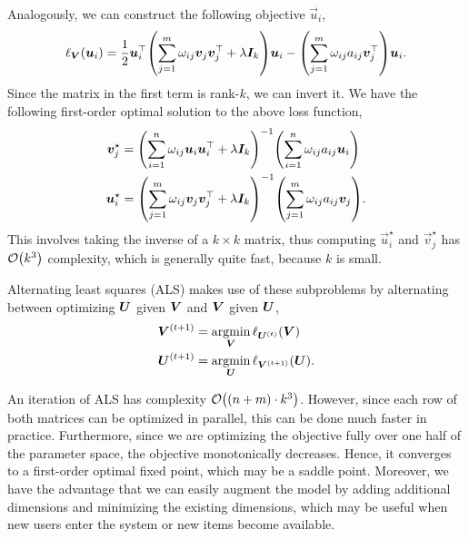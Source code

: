 Analogously, we can construct the following objective \wrt $\vec{u}_i$, \[
    \ell_{\mat{V}}(\vec{u}_i) = \frac{1}{2} \transpose{\vec{u}_i} \lft( \sum_{j=1}^{m} \omega_{ij} \vec{v}_j \transpose{\vec{v}_j} + \lambda \mat{I}_k \rgt) \vec{u}_i - \lft( \sum_{j=1}^{m} \omega_{ij} a_{ij} \transpose{\vec{v}_j} \rgt) \vec{u}_i.
\]
Since the matrix in the first term is rank-$k$, we can invert it. We have the following first-order
optimal solution to the above loss function,
\begin{align*}
    \vec{v}_j^\star & = \inv{\lft( \sum_{i=1}^{n} \omega_{ij} \vec{u}_i \transpose{\vec{u}_i} + \lambda \mat{I}_k \rgt)} \lft( \sum_{i=1}^{n} \omega_{ij} a_{ij} \vec{u}_i \rgt)  \\
    \vec{u}_i^\star & = \inv{\lft( \sum_{j=1}^{m} \omega_{ij} \vec{v}_j \transpose{\vec{v}_j} + \lambda \mat{I}_k \rgt)} \lft( \sum_{j=1}^{m} \omega_{ij} a_{ij} \vec{v}_j \rgt).
\end{align*}
This involves taking the inverse of a $k\times k$ matrix, thus computing $\vec{u}_i^\star$ and
$\vec{v}_j^\star$ has $\bigo{k^3}$ complexity, which is generally quite fast, because $k$ is small.

Alternating least squares (ALS) makes use of these subproblems by alternating between optimizing
$\bm{U}$ given $\bm{V}$ and $\bm{V}$ given $\bm{U}$,
\begin{align*}
    \bm{V}^{(t+1)} & = \operatorname*{argmin}_{\bm{V}} \ell_{\bm{U}^{(t)}}(\bm{V})    \\
    \bm{U}^{(t+1)} & = \operatorname*{argmin}_{\bm{U}} \ell_{\bm{V}^{(t+1)}}(\bm{U}).
\end{align*}

\begin{important}
    An iteration of ALS has complexity $\bigo{(n+m)\cdot k^3}$. However, since each row of both matrices can be
    optimized in parallel, this can be done much faster in practice. Furthermore, since we are optimizing
    the objective fully over one half of the parameter space, the objective monotonically decreases.
    Hence, it converges to a first-order optimal fixed point, which may be a saddle point. Moreover, we
    have the advantage that we can easily augment the model by adding additional dimensions and minimizing \wrt the existing dimensions, which may be
    useful when new users enter the system or new items become available.
\end{important}

